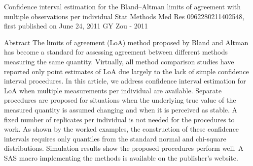 Confidence interval estimation for the Bland–Altman limits of agreement with multiple observations per individual
Stat Methods Med Res 0962280211402548, first published on June 24, 2011
GY Zou - ‎2011


Abstract
The limits of agreement (LoA) method proposed by Bland and Altman has become a standard for assessing agreement between different methods measuring the same quantity. Virtually, all method comparison studies have reported only point estimates of LoA due largely to the lack of simple confidence interval procedures. In this article, we address confidence interval estimation for LoA when multiple measurements per individual are available. Separate procedures are proposed for situations when the underlying true value of the measured quantity is assumed changing and when it is perceived as stable. A fixed number of replicates per individual is not needed for the procedures to work. As shown by the worked examples, the construction of these confidence intervals requires only quantiles from the standard normal and chi-square distributions. Simulation results show the proposed procedures perform well. A SAS macro implementing the methods is available on the publisher's website.
